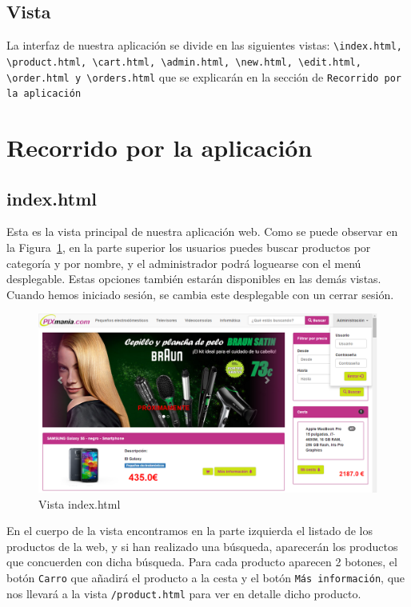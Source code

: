 \documentclass[12pt,a4paper,svgnames]{article}
\begin{document}
\subsection{Vista}
La interfaz de nuestra aplicación se divide en las siguientes vistas:
\texttt{\textbackslash index.html, \textbackslash product.html, \textbackslash cart.html, \textbackslash admin.html, \textbackslash new.html, \textbackslash edit.html, \textbackslash order.html y \textbackslash orders.html} que se explicarán en la sección de \texttt{Recorrido por la aplicación}


\clearpage

\section{Recorrido por la aplicación}

\subsection{index.html}
Esta es la vista principal de nuestra aplicación web. Como se puede observar en la Figura~\ref{fig:index_sin_admin}, en la parte superior los usuarios puedes buscar productos por categoría y por nombre, y el administrador podrá loguearse con el menú desplegable. Estas opciones también estarán disponibles en las demás vistas. Cuando hemos iniciado sesión, se cambia este desplegable con un cerrar sesión.

\begin{figure}[htbp]
\centering
\includegraphics[width=1\linewidth]{imagenes/index_con_admin}
\caption{Vista index.html}
\label{fig:index_sin_admin}
\end{figure}

En el cuerpo de la vista encontramos en la parte izquierda el listado de los productos de la web, y si han realizado una búsqueda, aparecerán los productos que concuerden con dicha búsqueda. 
Para cada producto aparecen 2 botones, el botón \texttt{Carro} que añadirá el producto a la cesta y el botón \texttt{Más información}, que nos llevará a la vista \texttt{/product.html} para ver en detalle dicho producto.\\
\end{document}
